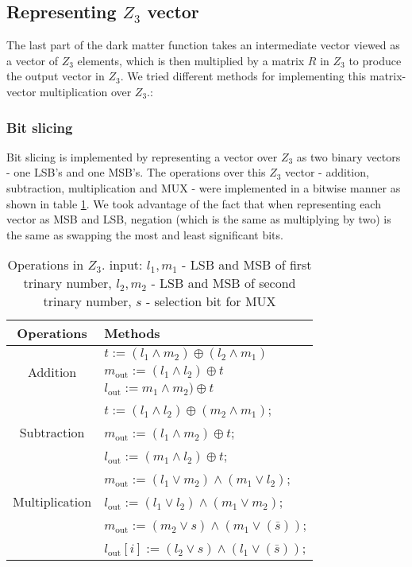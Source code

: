 \subsection{Representing $Z_3$ vector}

The last part of the dark matter function takes an intermediate vector viewed as a vector of $Z_3$ elements, which is then multiplied 
by a matrix $R$ in $Z_3$ to produce the output vector in $Z_3$. We tried different methods for implementing this matrix-vector multiplication over $Z_3$.:	

\subsubsection{Bit slicing} Bit slicing is implemented  by representing a vector over $Z_3$  as two binary vectors - one LSB's and one MSB's. The operations over this $Z_3$ vector - addition, subtraction, multiplication and MUX  - were implemented in a bitwise manner as shown in table \ref{tab:multicol}. We took advantage of the fact that when representing each vector as MSB and LSB, negation (which is the same as multiplying by two) is the same as swapping the most and least significant bits. 
\fi




\begin{table}[ht]
	\caption{Operations in $Z_3$. input:   ${l_1}, {m_1}$ - LSB and MSB  of first trinary number, 
		${l_2}, {m_2}$ - LSB and MSB  of second trinary number,  ${s}$ - selection bit for MUX}
	\begin{center}
		\begin{tabular}{|c|l|}
			\hline
			\textbf{Operations} & \textbf{Methods}\\
			\hline
			\multirow{3}{*}{Addition} & ${t} := ({l_1 \wedge m_2}) \oplus ({l_2 \wedge m_1})$\\
			& $m_{\mathrm{out}} := ( l_1 \wedge  l_2 ) \oplus  t $ \\
			& $l_{\mathrm{out}} :=m_1 \wedge m_2 ) \oplus t $ \\
			\hline
			\multirow{3}{*}{Subtraction} & ${t} := ({l_1} \wedge {l_2}) \oplus ({m_2} \wedge {m_1})$;\\
			& $m_{\mathrm{out}} := (l_1 \wedge m_2 ) \oplus t$;\\
			& $l_{\mathrm{out}} := (m_1 \wedge l_2 ) \oplus t$; \\
			\hline
			\multirow{3}{*}{Multiplication} & $m_{\mathrm{out}}:= (l_1 \vee m_2) \wedge   (m_1 \vee l_2)$; \\
			& $l_{\mathrm{out}} := (l_1 \vee l_2) \wedge     (m_1 \vee m_2)$;\\
			\hline
			\multirow{3}{*}{MUX} & $m_{\mathrm{out}} :=( m_2 \vee s) \wedge (m_1 \vee (\bar{s}) )$; \\
			& $l_{\mathrm{out}}[i] :=( l_2 \vee s) \wedge (l_1 \vee (\bar{s}) )$; \\
			\hline
			
		\end{tabular}
	\end{center}
	\label{tab:multicol}
\end{table}


